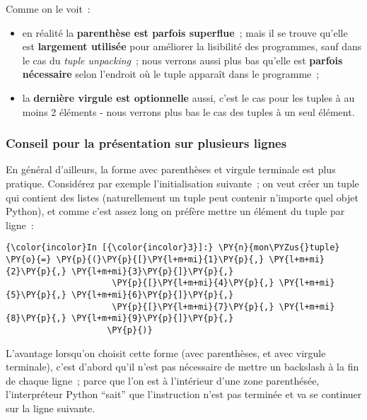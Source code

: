     Comme on le voit~:

\begin{itemize}
\tightlist
\item
  en réalité la \textbf{parenthèse est parfois superflue}~; mais il se
  trouve qu'elle est \textbf{largement utilisée} pour améliorer la
  lisibilité des programmes, sauf dans le cas du \emph{tuple
  unpacking}~; nous verrons aussi plus bas qu'elle est \textbf{parfois
  nécessaire} selon l'endroit où le tuple apparaît dans le programme~;
\item
  la \textbf{dernière virgule est optionnelle} aussi, c'est le cas pour
  les tuples à au moins 2 éléments - nous verrons plus bas le cas des
  tuples à un seul élément.
\end{itemize}

    \hypertarget{conseil-pour-la-pruxe9sentation-sur-plusieurs-lignes}{%
\subsubsection{Conseil pour la présentation sur plusieurs
lignes}\label{conseil-pour-la-pruxe9sentation-sur-plusieurs-lignes}}

    En général d'ailleurs, la forme avec parenthèses et virgule terminale
est plus pratique. Considérez par exemple l'initialisation suivante~; on
veut créer un tuple qui contient des listes (naturellement un tuple peut
contenir n'importe quel objet Python), et comme c'est assez long on
préfère mettre un élément du tuple par ligne~:

    \begin{Verbatim}[commandchars=\\\{\}]
{\color{incolor}In [{\color{incolor}3}]:} \PY{n}{mon\PYZus{}tuple} \PY{o}{=} \PY{p}{(}\PY{p}{[}\PY{l+m+mi}{1}\PY{p}{,} \PY{l+m+mi}{2}\PY{p}{,} \PY{l+m+mi}{3}\PY{p}{]}\PY{p}{,}
                     \PY{p}{[}\PY{l+m+mi}{4}\PY{p}{,} \PY{l+m+mi}{5}\PY{p}{,} \PY{l+m+mi}{6}\PY{p}{]}\PY{p}{,}
                     \PY{p}{[}\PY{l+m+mi}{7}\PY{p}{,} \PY{l+m+mi}{8}\PY{p}{,} \PY{l+m+mi}{9}\PY{p}{]}\PY{p}{,}
                    \PY{p}{)}
\end{Verbatim}


    L'avantage lorsqu'on choisit cette forme (avec parenthèses, et avec
virgule terminale), c'est d'abord qu'il n'est pas nécessaire de mettre
un backslash à la fin de chaque ligne~; parce que l'on est à l'intérieur
d'une zone parenthésée, l'interpréteur Python ``sait'' que l'instruction
n'est pas terminée et va se continuer sur la ligne suivante.

